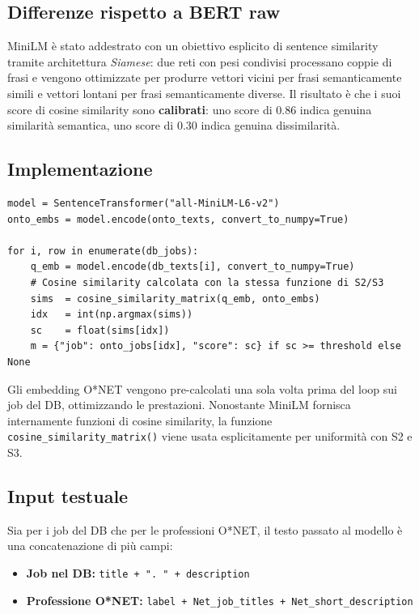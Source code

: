 \documentclass[12pt, a4paper]{report}
\begin{document}
\subsection{Differenze rispetto a BERT raw}

MiniLM è stato addestrato con un obiettivo esplicito di sentence
similarity tramite architettura \emph{Siamese}: due reti con pesi
condivisi processano coppie di frasi e vengono ottimizzate per
produrre vettori vicini per frasi semanticamente simili e vettori
lontani per frasi semanticamente diverse. Il risultato è che i suoi
score di cosine similarity sono \textbf{calibrati}: uno score di 0.86
indica genuina similarità semantica, uno score di 0.30 indica
genuina dissimilarità.

\subsection{Implementazione}

\begin{lstlisting}[caption={Matching con MiniLM}]
model = SentenceTransformer("all-MiniLM-L6-v2")
onto_embs = model.encode(onto_texts, convert_to_numpy=True)

for i, row in enumerate(db_jobs):
    q_emb = model.encode(db_texts[i], convert_to_numpy=True)
    # Cosine similarity calcolata con la stessa funzione di S2/S3
    sims  = cosine_similarity_matrix(q_emb, onto_embs)
    idx   = int(np.argmax(sims))
    sc    = float(sims[idx])
    m = {"job": onto_jobs[idx], "score": sc} if sc >= threshold else None
\end{lstlisting}

Gli embedding O*NET vengono pre-calcolati una sola volta prima del
loop sui job del DB, ottimizzando le prestazioni. Nonostante MiniLM
fornisca internamente funzioni di cosine similarity, la funzione
\texttt{cosine\_similarity\_matrix()} viene usata esplicitamente per
uniformità con S2 e S3.

\newpage
\subsection{Input testuale}

Sia per i job del DB che per le professioni O*NET, il testo passato
al modello è una concatenazione di più campi:

\begin{itemize}
  \item \textbf{Job nel DB:} \texttt{title + ". " + description}
  \item \textbf{Professione O*NET:} \texttt{label + Net\_job\_titles + Net\_short\_description}
\end{itemize}
\end{document}
